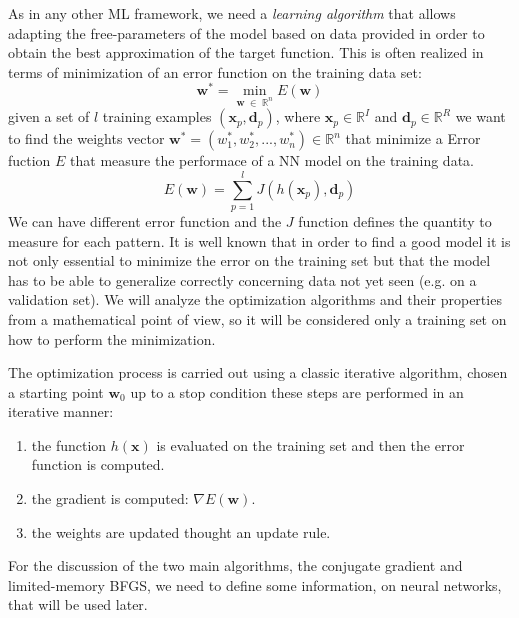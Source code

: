 \documentclass[11pt]{article}
\begin{document}
As in any other ML framework, we need a \emph{learning algorithm} that allows adapting the free-parameters of the model based on data provided in order to obtain the best approximation of the target function. This is often realized in terms of minimization of an error function on the training data set:
\begin{equation}
    \mathbf{w}^* = \min_{\mathbf{w} \;	\in \; \mathbb{R}^n} E(\mathbf{w})
    \label{eq:minimum}
\end{equation}
given a set of $l$ training examples $(\mathbf{x}_p,\mathbf{d}_p)$, where $\mathbf{x}_p \in \mathbb{R}^I$ and $\mathbf{d}_p \in \mathbb{R}^R$ we want to find the weights vector $\mathbf{w}^* = (w_1^*,w_2^*, ..., w_n^*) \in \mathbb{R}^n$  that minimize a Error fuction $E$ that measure the performace of a NN model on the training data.
\begin{equation}
E(\mathbf{w})  = \sum_{p=1}^{l}J(h(\mathbf{x}_p), \mathbf{d}_p)
\end{equation}
We can have different error function and the $J$ function defines the quantity to measure for each pattern. It is well known that in order to find a good model it is not only essential to minimize the error on the training set but that the model has to be able to generalize correctly concerning data not yet seen (e.g. on a validation set). We will analyze the optimization algorithms and their properties from a mathematical point of view, so it will be considered only a training set on how to perform the minimization. 

The optimization process is carried out using a classic iterative algorithm, chosen a starting point $\mathbf{w}_0$ up to a stop condition these steps are performed in an iterative manner:
\begin{enumerate}
    \item the function $h(\mathbf{x})$ is evaluated on the training set and then the error function is computed.
    \item the gradient is computed: $\nabla E(\mathbf{w})$.
    \item the weights are updated thought an update rule.
\end{enumerate}

For the discussion of the two main algorithms, the conjugate gradient and limited-memory BFGS, we need to define some information, on neural networks, that will be used later.
\end{document}
